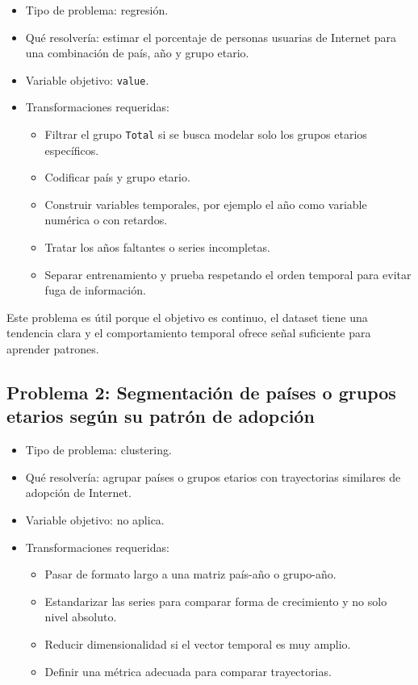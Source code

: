 \documentclass[12pt,a4paper]{article}
\begin{document}
\begin{itemize}
    \item Tipo de problema: regresión.
    \item Qué resolvería: estimar el porcentaje de personas usuarias de Internet para una combinación de país, año y grupo etario.
    \item Variable objetivo: \texttt{value}.
    \item Transformaciones requeridas:
    \begin{itemize}
        \item Filtrar el grupo \texttt{Total} si se busca modelar solo los grupos etarios específicos.
        \item Codificar país y grupo etario.
        \item Construir variables temporales, por ejemplo el año como variable numérica o con retardos.
        \item Tratar los años faltantes o series incompletas.
        \item Separar entrenamiento y prueba respetando el orden temporal para evitar fuga de información.
    \end{itemize}
\end{itemize}

Este problema es útil porque el objetivo es continuo, el dataset tiene una tendencia clara y el comportamiento temporal ofrece señal suficiente para aprender patrones.

\subsection{Problema 2: Segmentación de países o grupos etarios según su patrón de adopción}

\begin{itemize}
    \item Tipo de problema: clustering.
    \item Qué resolvería: agrupar países o grupos etarios con trayectorias similares de adopción de Internet.
    \item Variable objetivo: no aplica.
    \item Transformaciones requeridas:
    \begin{itemize}
        \item Pasar de formato largo a una matriz país-año o grupo-año.
        \item Estandarizar las series para comparar forma de crecimiento y no solo nivel absoluto.
        \item Reducir dimensionalidad si el vector temporal es muy amplio.
        \item Definir una métrica adecuada para comparar trayectorias.
    \end{itemize}
\end{itemize}
\end{document}
